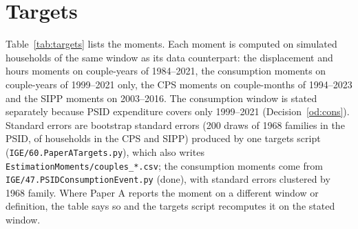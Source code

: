 \documentclass[11pt]{article}
\newcommand{\code}[1]{\texttt{#1}}
\newcommand{\1}{\mathbf{1}}
\begin{document}
\section{Targets}\label{sec:targets}

Table~\ref{tab:targets} lists the moments. Each moment is computed on simulated households of the same window as its
data counterpart: the displacement and hours moments on couple-years of 1984--2021, the consumption moments on
couple-years of 1999--2021 only, the CPS moments on couple-months of 1994--2023 and the SIPP moments on 2003--2016. The
consumption window is stated separately because PSID expenditure covers only 1999--2021 (Decision~\ref{od:cons}).
Standard errors are bootstrap standard errors (200 draws of 1968 families in the PSID, of households in the CPS and
SIPP) produced by one targets script (\code{IGE/60.PaperATargets.py}), which also writes
\code{EstimationMoments/couples\_*.csv}; the consumption moments come from \code{IGE/47.PSIDConsumptionEvent.py}
(done), with standard errors clustered by 1968 family.
Where Paper A reports the moment on a different window or definition, the table says so and the targets script
recomputes it on the stated window.
\end{document}
